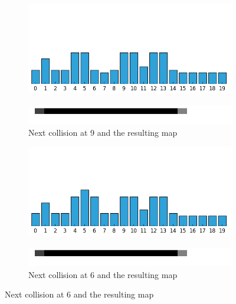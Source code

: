 \begin{exmp}
\begin{figure}
\begin{minipage}{0.48\textwidth}
\centering
\begin{subfigure}{\textwidth}
\centering
\includegraphics[scale=0.4]{./images/ex24/ex24coll9.png}
\end{subfigure}
\begin{subfigure}{\textwidth}
\centering
\includegraphics[scale=0.4]{./images/ex24/ex24wall9.png}
\caption{Next collision at 9 and the resulting map}
\end{subfigure}
\end{minipage}
\begin{minipage}{0.48\textwidth}
\centering
\begin{subfigure}{\textwidth}
\centering
\includegraphics[scale=0.4]{./images/ex24/ex24coll6.png}
\end{subfigure}
\begin{subfigure}{\textwidth}
\centering
\includegraphics[scale=0.4]{./images/ex24/ex24wall6.png}
\caption{Next collision at 6 and the resulting map}
\end{subfigure}
\end{minipage}


\end{figure}
\end{exmp}

